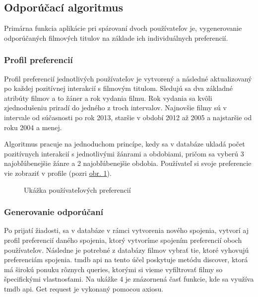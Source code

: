 \subsection{Odporúčací algoritmus}
Primárna funkcia aplikácie pri spárovaní dvoch používateľov je, vygenerovanie odporúčaných filmových titulov na základe ich individuálnych preferencií.  
\subsubsection{Profil preferencií}
Profil preferencií jednotlivých používateľov je vytvorený a následné aktualizovaný po každej pozitívnej interakcií s filmovým titulom. Sledujú sa dva základné atribúty filmov a to žáner a rok vydania filmu. Rok vydania sa kvôli zjednodušeniu priradí do jedného z troch intervalov. Najnovšie filmy sú v intervale od súčasnosti po rok 2013, staršie v období 2012 až 2005 a najstaršie od roku 2004 a menej.

Algoritmus pracuje na jednoduchom princípe, kedy sa v databáze ukladá počet pozitívnych interakcií s jednotlivými žánrami a obdobiami, pričom sa vyberú 3 najobľúbenejšie žánre a 2 najobľúbenejšie obdobia. Používateľ si svoje preferencie vie zobraziť v profile (pozri \hyperref[userprofile]{obr. \ref{userprofile}}).
\begin{figure}[hbt!]
  \centering   
  \def\stackalignment{c}
           \scriptsize
	\caption{Ukážka používateľových preferencií}  
  \label{userprofile}
\end{figure}

\subsubsection{Generovanie odporúčaní}
Po prijatí žiadosti, sa v databáze v rámci vytvorenia nového spojenia, vytvorí aj profil preferencií daného spojenia, ktorý vytvoríme spojením preferencií oboch používateľov. Následne je potrebné z databázy filmov vybrať tie, ktoré vyhovujú preferenciám spojenia. \acrshort{tmdb} \acrshort{api} na tento účel poskytuje metódu discover, ktorá má širokú ponuku rôznych queries, ktorými si vieme vyfiltrovať filmy so špecifickými vlastnosťami. Na ukážke 4 je znázornená časť funkcie, kde sa využíva \acrshort{tmdb} \acrshort{api}. Get request je vykonaný pomocou axiosu.

